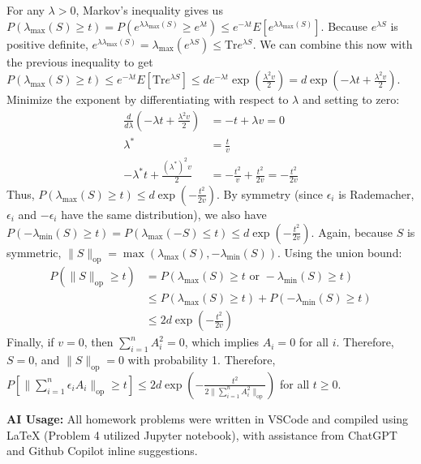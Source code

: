 \documentclass[11pt,a4paper,margin=1in]{article}
\begin{document}
\noindent
For any $\lambda > 0$, Markov's inequality gives us $P(\lambda_{\max}(S) \geq t) = P(e^{\lambda \lambda_{\max}(S)} \geq e^{\lambda t}) \leq e^{-\lambda t} E[e^{\lambda \lambda_{\max}(S)}]$. 
Because $e^{\lambda S}$ is positive definite, $e^{\lambda \lambda_{\max}(S)} = \lambda_{\max}(e^{\lambda S}) \leq \text{Tr} e^{\lambda S}$. 
We can combine this now with the previous inequality to get $P(\lambda_{\max}(S) \geq t) \leq e^{-\lambda t} E[\text{Tr} e^{\lambda S}] \leq d e^{-\lambda t} \exp(\frac{\lambda^2 v}{2}) = d \exp(-\lambda t + \frac{\lambda^2 v}{2} )$.
Minimize the exponent by differentiating with respect to $\lambda$ and setting to zero:
\begin{align*}
    \frac{d}{d\lambda}(-\lambda t + \frac{\lambda^2 v}{2}) &= -t + \lambda v = 0 \\
    \lambda^* &= \frac{t}{v} \\
    -\lambda^* t + \frac{(\lambda^*)^2 v}{2} &= -\frac{t^2}{v} + \frac{t^2}{2v} = -\frac{t^2}{2v}
\end{align*}
Thus, $P(\lambda_{\max}(S) \geq t) \leq d \exp(-\frac{t^2}{2v})$. By symmetry
(since $\epsilon_i$ is Rademacher, $\epsilon_i$ and $-\epsilon_i$ have the same distribution), 
we also have $P(-\lambda_{\min}(S) \geq t) = P(\lambda_{\max}(-S) \leq t) \leq d \exp(-\frac{t^2}{2v})$.
Again, because $S$ is symmetric, $\|S\|_\text{op} = \max(\lambda_{\max}(S), -\lambda_{\min}(S))$. 
Using the union bound:
\begin{align*}
    P(\|S\|_\text{op} \geq t) &= P(\lambda_{\max}(S) \geq t \text{ or } -\lambda_{\min}(S) \geq t) \\
    &\leq P(\lambda_{\max}(S) \geq t) + P(-\lambda_{\min}(S) \geq t) \\
    &\leq 2 d \exp(-\frac{t^2}{2v})
\end{align*}
Finally, if $v = 0$, then $\sum_{i = 1}^n A_i^2 = 0$, which implies $A_i = 0$ for all $i$. 
Therefore, $S = 0$, and $\|S\|_\text{op} = 0$ with probability 1. Therefore,
$P\left[\|\sum_{i = 1}^n \epsilon_i A_i\|_\text{op} \geq t\right] \leq 2d\exp(-\frac{t^2}{2\|\sum_{i = 1}^n A_i^2\|_\text{op}})$ for all $t \geq 0$. 



\noindent 
\textbf{AI Usage:} All homework problems were written in VSCode and compiled using LaTeX
(Problem 4 utilized Jupyter notebook), with assistance from ChatGPT and Github 
Copilot inline suggestions.
\end{document}
